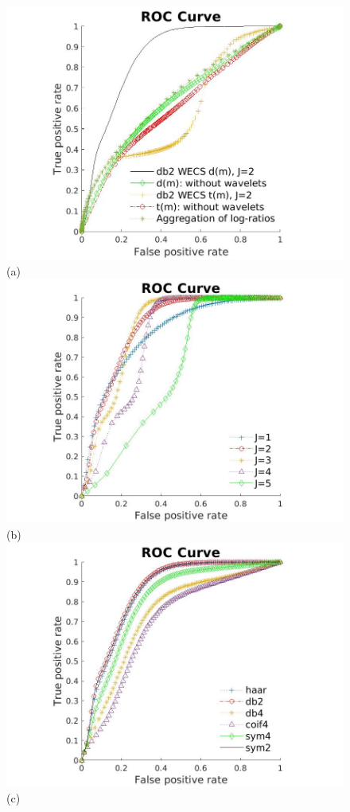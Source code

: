 \documentclass[journal]{IEEEtran}
\begin{document}
\begin{figure}[htp!]
\includegraphics[scale=.13]{../../figs/methods_comparison}\hspace{-.5cm}(a) 
\includegraphics[scale=.13]{../../figs/levels_comparison_WithReference}\hspace{-.5cm}(b)\\
\includegraphics[scale=.13]{../../figs/families_comparison_WithReference}\hspace{-.5cm}(c)

\end{figure}
\end{document}
